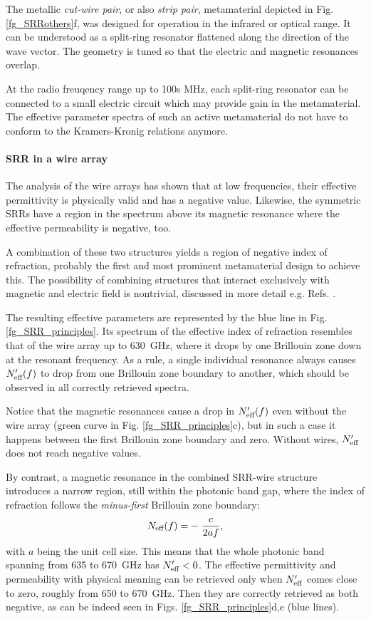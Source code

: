 The metallic \textit{cut-wire pair}, or also \textit{strip pair}, metamaterial depicted in Fig. \ref{fg_SRRothers}f, was designed for operation in the infrared or optical range. It can be understood as a split-ring resonator flattened along the direction of the wave vector. The geometry is tuned so that the electric and magnetic resonances overlap.	

At the radio freuqency range up to 100s MHz, each split-ring resonator can be connected to a small electric circuit which may provide gain \cite{jelinek2011fet} in the metamaterial. The effective parameter spectra of such an active metamaterial do not have to conform to the Kramers-Kronig relations anymore.

\paragraph{SRR in a wire array} %
The analysis of the wire arrays has shown that at low frequencies, their effective permittivity is physically valid and has a negative value. Likewise, the symmetric SRRs have a region in the spectrum above its magnetic resonance where the effective permeability is negative, too.

A combination of these two structures yields a region of negative index of refraction, probably the first \cite{pendry2000negative} and most prominent metamaterial design to achieve this. The possibility of combining structures that interact exclusively with magnetic and electric field is nontrivial, discussed  in more detail e.g. Refs. \cite{koschny2004effective, baena2007towards}.

The resulting effective parameters are represented by the blue line in Fig. \ref{fg_SRR_principles}. Its spectrum of the effective index of refraction resembles that of the wire array up to 630~GHz, where it drops by one Brillouin zone down at the resonant frequency.
As a rule, a single individual resonance always causes $N_{\text{eff} }'(f)$ to drop from one Brillouin zone boundary to another, which should be observed in all correctly retrieved spectra. 

Notice that the magnetic resonances cause a drop in $N_{\text{eff} }'(f)$ even without the wire array (green curve in Fig. \ref{fg_SRR_principles}c), but in such a case it happens between the first Brillouin zone boundary and zero. Without wires, $N_{\text{eff} }'$ does not reach negative values.

By contrast, a magnetic resonance in the combined SRR-wire structure introduces a narrow region, still within the photonic band gap, where the index of refraction follows the \textit{minus-first} Brillouin zone boundary:
\begin{equation} N_{\text{eff} }(f) = -\;\frac{c}{2 a f}, \label{eq_BZN2}\end{equation}
with $a$ being the unit cell size. This means that the whole photonic band spanning from 635 to 670~GHz has $N_{\text{eff} }'<0$. The effective permittivity and permeability with physical meaning can be retrieved only when $N_{\text{eff} }'$ comes close to zero, roughly from 650 to 670~GHz. Then they are correctly retrieved as both negative, as can be indeed seen in Figs. \ref{fg_SRR_principles}d,e (blue lines).

